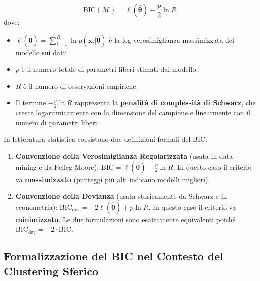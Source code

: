 \begin{equation}
\label{eq:dm-bic-definition}
\mathrm{BIC}(\mathcal{M}) = \ell(\hat{\boldsymbol{\theta}}) - \frac{p}{2} \ln R
\end{equation}
dove:
\begin{itemize}
    \item $\ell(\hat{\boldsymbol{\theta}}) = \sum_{i=1}^R \ln p(\mathbf{x}_i | \hat{\boldsymbol{\theta}})$ è la log-verosimiglianza massimizzata del modello sui dati;
    \item $p$ è il numero totale di parametri liberi stimati dal modello;
    \item $R$ è il numero di osservazioni empiriche;
    \item Il termine $-\frac{p}{2} \ln R$ rappresenta la \textbf{penalità di complessità di Schwarz}, che cresce logaritmicamente con la dimensione del campione e linearmente con il numero di parametri liberi.
\end{itemize}

\begin{remark}
In letteratura statistica coesistono due definizioni formali del BIC:
\begin{enumerate}
    \item \textbf{Convenzione della Verosimiglianza Regolarizzata} (usata in data mining e da Pelleg-Moore): $\mathrm{BIC} = \ell(\hat{\boldsymbol{\theta}}) - \frac{p}{2} \ln R$. In questo caso il criterio va \textbf{massimizzato} (punteggi più alti indicano modelli migliori).
    \item \textbf{Convenzione della Devianza} (usata storicamente da Schwarz e in econometria): $\mathrm{BIC}_{\text{dev}} = -2 \ell(\hat{\boldsymbol{\theta}}) + p \ln R$. In questo caso il criterio va \textbf{minimizzato}. Le due formulazioni sono esattamente equivalenti poiché $\mathrm{BIC}_{\text{dev}} = -2 \cdot \mathrm{BIC}$.
\end{enumerate}
\end{remark}

\subsection{Formalizzazione del BIC nel Contesto del Clustering Sferico}

